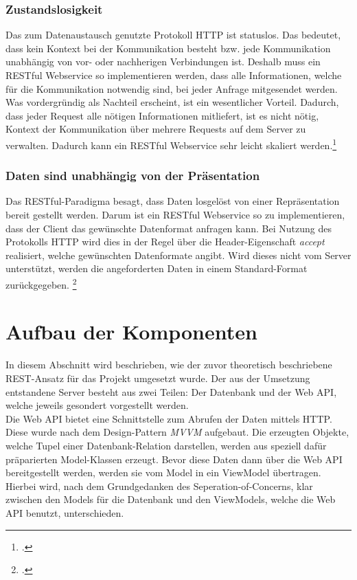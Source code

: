 \subsubsection*{Zustandslosigkeit}
Das zum Datenaustausch genutzte Protokoll \ac{HTTP} ist statuslos. Das bedeutet, dass kein Kontext bei der Kommunikation besteht bzw. jede Kommunikation unabhängig von vor- oder nachherigen Verbindungen ist. Deshalb muss ein \ac{REST}ful Webservice so implementieren werden, dass alle Informationen, welche für die Kommunikation notwendig sind, bei jeder Anfrage mitgesendet werden. Was vordergründig als Nachteil erscheint, ist ein wesentlicher Vorteil. Dadurch, dass jeder Request alle nötigen Informationen mitliefert, ist es nicht nötig, Kontext der Kommunikation über mehrere Requests auf dem Server zu verwalten. Dadurch kann ein \ac{REST}ful Webservice sehr leicht skaliert werden.\footcite[S. 26ff.]{REST-und-HTTP}
\subsubsection*{Daten sind unabhängig von der Präsentation}
Das \ac{REST}ful-Paradigma besagt, dass Daten losgelöst von einer Repräsentation bereit gestellt werden. Darum ist ein \ac{REST}ful Webservice so zu implementieren, dass der Client das gewünschte Datenformat anfragen kann. Bei Nutzung des Protokolls HTTP wird dies in der Regel über die Header-Eigenschaft \textit{accept} realisiert, welche gewünschten Datenformate angibt. Wird dieses nicht vom Server unterstützt, werden die angeforderten Daten in einem Standard-Format zurückgegeben. \footcite[S. 26ff.]{REST-und-HTTP}
\section{Aufbau der Komponenten}
\label{sec:aufbau-Komponenten}
In diesem Abschnitt wird beschrieben, wie der zuvor theoretisch beschriebene \ac{REST}-Ansatz für das Projekt umgesetzt wurde. Der aus der Umsetzung entstandene Server besteht aus zwei Teilen: Der Datenbank und der Web \ac{API}, welche jeweils gesondert vorgestellt werden. \\
Die Web \ac{API} bietet eine Schnittstelle zum Abrufen der Daten mittels \ac{HTTP}. Diese wurde nach dem Design-Pattern \textit{\ac{MVVM}} aufgebaut. Die erzeugten Objekte, welche Tupel einer Datenbank-Relation darstellen, werden aus speziell dafür präparierten Model-Klassen erzeugt. Bevor diese Daten dann über die Web \ac{API} bereitgestellt werden, werden sie vom Model in ein ViewModel übertragen. Hierbei wird, nach dem Grundgedanken des \gls{Seperation-of-Concerns}, klar zwischen den Models für die Datenbank und den ViewModels, welche die Web \ac{API} benutzt, unterschieden.
